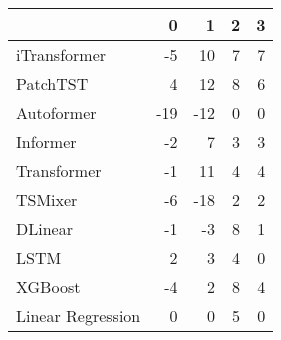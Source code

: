 \begin{tabular}{lrrrr}
\toprule
 & 0 & 1 & 2 & 3 \\
\midrule
iTransformer & -5 & 10 & 7 & 7 \\
PatchTST & 4 & 12 & 8 & 6 \\
Autoformer & -19 & -12 & 0 & 0 \\
Informer & -2 & 7 & 3 & 3 \\
Transformer & -1 & 11 & 4 & 4 \\
TSMixer & -6 & -18 & 2 & 2 \\
DLinear & -1 & -3 & 8 & 1 \\
LSTM & 2 & 3 & 4 & 0 \\
XGBoost & -4 & 2 & 8 & 4 \\
Linear Regression & 0 & 0 & 5 & 0 \\
\bottomrule
\end{tabular}
